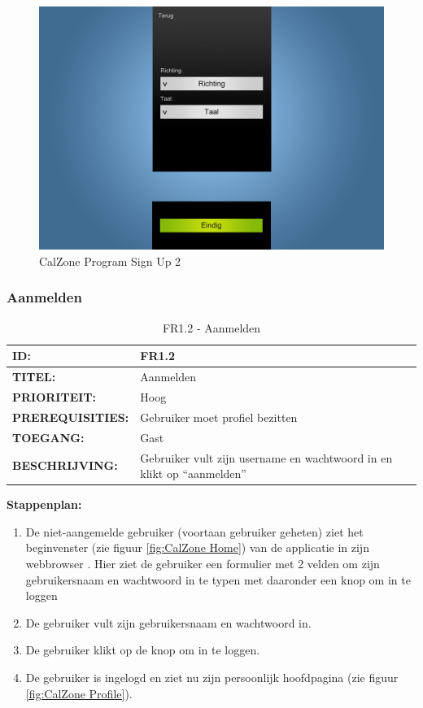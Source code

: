 \begin{center}
\begin{figure}[H]
\caption{CalZone Program Sign Up 2}
\centerline{\includegraphics[scale=0.4]{img/Calzonesignup2}}
\label{fig:CalZone Program Sign Up 2}
\end{figure}

\end{center}

\subsubsection{Aanmelden}
\noindent\begin{table}[H]
            \begin{tabular}{l | p{10cm}}
                \textbf{ID:} & FR1.2 \\ \hline
                \textbf{TITEL:} & Aanmelden \\ \hline
                \textbf{PRIORITEIT:} &  Hoog \\ \hline
                \textbf{PREREQUISITIES:} & Gebruiker moet profiel bezitten\\ \hline
                \textbf{TOEGANG:} &  Gast \\ \hline
                \textbf{BESCHRIJVING:} & Gebruiker vult zijn username en wachtwoord in en klikt op “aanmelden”\\
            \end{tabular}
            \caption{FR1.2 - Aanmelden}
            \label{tab:FR1.2 - Aanmelden}
        \end{table}
        
\textbf{Stappenplan:}
\begin{enumerate}
\item De niet-aangemelde gebruiker (voortaan gebruiker geheten) ziet het beginvenster (zie figuur \ref{fig:CalZone Home}) van de applicatie in zijn webbrowser . Hier ziet de gebruiker een formulier met 2 velden om zijn gebruikersnaam en wachtwoord in te typen met daaronder een knop om in te loggen
\item De gebruiker vult zijn gebruikersnaam en wachtwoord in.
\item De gebruiker klikt op de knop om in te loggen.
\item De gebruiker is ingelogd en ziet nu zijn persoonlijk hoofdpagina (zie figuur \ref{fig:CalZone Profile}).
\end{enumerate}

